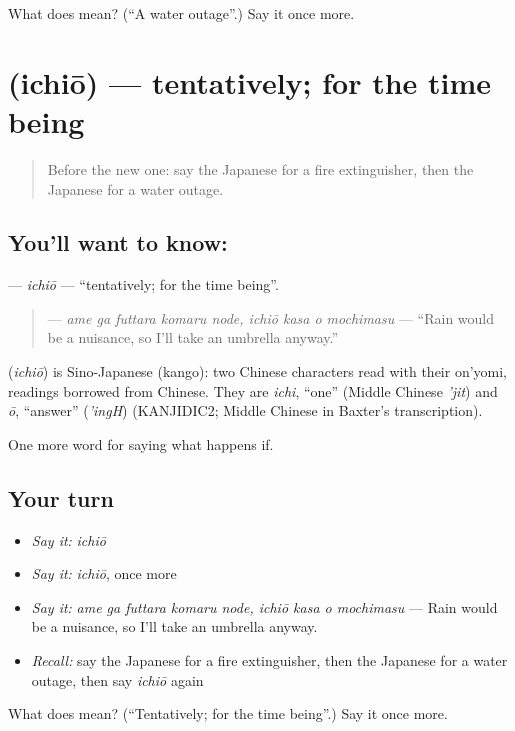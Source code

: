 \begin{tcolorbox}[breakable,colback=teal!4,colframe=teal!35!black,title={Before you move on}]
What does  mean? (\textquotedblleft{}A water outage\textquotedblright{}.) Say it once more.
\end{tcolorbox}
\section[\texorpdfstring{\ja{いちおう} (ichiō)}{いちおう (ichiō)}]{ (ichiō) — tentatively; for the time being}

\label{lesson:JA-C353-ichiou}



\begin{quote}
Before the new one: say the Japanese for a fire extinguisher, then the Japanese for a water outage.
\end{quote}

\subsection*{You'll want to know: }
\textbf{} — \emph{ichiō} — \textquotedblleft{}tentatively; for the time being\textquotedblright{}.

\begin{quote}
\textbf{    } — \emph{ame ga futtara komaru node, ichiō kasa o mochimasu} — \textquotedblleft{}Rain would be a nuisance, so I'll take an umbrella anyway.\textquotedblright{}
\end{quote}

\begin{cousinweb}
\textbf{} (\emph{ichiō}) is Sino-Japanese (kango): two Chinese characters read with their on'yomi, readings borrowed from Chinese. They are \emph{ichi}, \textquotedblleft{}one\textquotedblright{} (Middle Chinese \emph{'jit}) and \emph{ō}, \textquotedblleft{}answer\textquotedblright{} (\emph{'ingH}) (KANJIDIC2; Middle Chinese in Baxter's transcription).
\end{cousinweb}

\begin{grammarlens}[title={What you've built}]
One more word for saying what happens if.
\end{grammarlens}

\subsection*{Your turn}
\begin{itemize}
\raggedright
  \item \emph{Say it:} \emph{ichiō}
  \item \emph{Say it:} \emph{ichiō}, once more
  \item \emph{Say it:} \emph{ame ga futtara komaru node, ichiō kasa o mochimasu} — Rain would be a nuisance, so I'll take an umbrella anyway.
  \item \emph{Recall:} say the Japanese for a fire extinguisher, then the Japanese for a water outage, then say \emph{ichiō} again
\end{itemize}

\begin{tcolorbox}[breakable,colback=teal!4,colframe=teal!35!black,title={Before you move on}]
What does  mean? (\textquotedblleft{}Tentatively; for the time being\textquotedblright{}.) Say it once more.
\end{tcolorbox}
